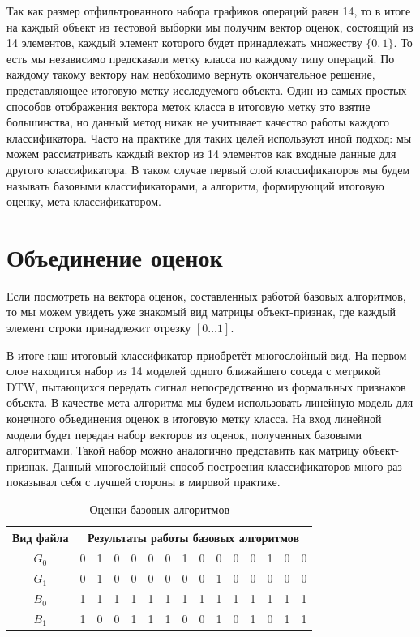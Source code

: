 Так как размер отфильтрованного набора графиков операций равен 14, то в итоге на каждый объект из тестовой выборки мы получим вектор оценок, состоящий из 14 элементов, каждый элемент которого будет принадлежать множеству $\{0, 1\}$. То есть мы независимо предсказали метку класса по каждому типу операций. По каждому такому вектору нам необходимо вернуть окончательное решение, представляющее итоговую метку исследуемого объекта. Один из самых простых способов отображения вектора меток класса в итоговую метку это взятие большинства, но данный метод никак не учитывает качество работы каждого классификатора. Часто на практике для таких целей используют иной подход: мы можем рассматривать каждый вектор из 14 элементов как входные данные для другого классификатора. В таком случае первый слой классификаторов мы будем называть базовыми классификаторами, а алгоритм, формирующий итоговую оценку, мета-классификатором.

\section{Объединение оценок}

Если посмотреть на вектора оценок, составленных работой базовых алгоритмов, то мы можем увидеть уже знакомый вид матрицы объект-признак, где каждый элемент строки принадлежит отрезку $[0 \dots 1]$.

В итоге наш итоговый классификатор приобретёт многослойный вид. На первом слое находится набор из 14 моделей одного ближайшего соседа с метрикой DTW, пытающихся передать сигнал непосредственно из формальных признаков объекта. В качестве мета-алгоритма мы будем использовать линейную модель для конечного объединения оценок в итоговую метку класса. На вход линейной модели будет передан набор векторов из оценок, полученных базовыми алгоритмами. Такой набор можно аналогично представить как матрицу объект-признак. Данный многослойный способ построения классификаторов много раз показывал себя с лучшей стороны в мировой практике.

\bgroup
\def\arraystretch{1.5}%
\begin{table}[ht]
\caption{Оценки базовых алгоритмов}
\label{tab_weight}
\centering
    \begin{tabular}{|c|c|c|c|c|c|c|c|c|c|c|c|c|c|c|}
    \hline Вид файла & \multicolumn{14}{c|}{Результаты работы базовых алгоритмов} \\
	\hline $G_0$ & 0 & 1 & 0 & 0 & 0 & 0 & 1 & 0 & 0 & 0 & 0 & 1 & 0 & 0 \\
	\hline $G_1$ & 0 & 1 & 0 & 0 & 0 & 0 & 0 & 0 & 1 & 0 & 0 & 0 & 0 & 0 \\
	\hline $B_0$ & 1 & 1 & 1 & 1 & 1 & 1 & 1 & 1 & 1 & 1 & 1 & 1 & 1 & 1 \\
	\hline $B_1$ & 1 & 0 & 0 & 1 & 1 & 1 & 0 & 0 & 1 & 0 & 1 & 0 & 1 & 1 \\

	\hline
    \end{tabular}
\end{table}
\egroup

